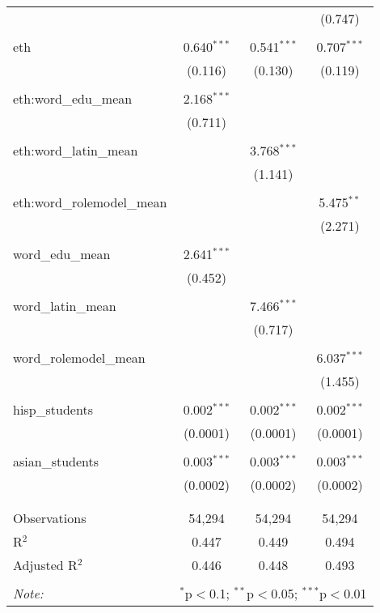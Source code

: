 \begin{table}[!htbp]
\begin{tabular}{@{\extracolsep{-2pt}}lccc}
  &  &  & (0.747) \\ 
  & & & \\ 
 eth & 0.640$^{***}$ & 0.541$^{***}$ & 0.707$^{***}$ \\ 
  & (0.116) & (0.130) & (0.119) \\ 
  & & & \\ 
 eth:word\_edu\_mean & 2.168$^{***}$ &  &  \\ 
  & (0.711) &  &  \\ 
  & & & \\ 
 eth:word\_latin\_mean &  & 3.768$^{***}$ &  \\ 
  &  & (1.141) &  \\ 
  & & & \\ 
 eth:word\_rolemodel\_mean &  &  & 5.475$^{**}$ \\ 
  &  &  & (2.271) \\ 
  & & & \\ 
 word\_edu\_mean & 2.641$^{***}$ &  &  \\ 
  & (0.452) &  &  \\ 
  & & & \\ 
 word\_latin\_mean &  & 7.466$^{***}$ &  \\ 
  &  & (0.717) &  \\ 
  & & & \\ 
 word\_rolemodel\_mean &  &  & 6.037$^{***}$ \\ 
  &  &  & (1.455) \\ 
  & & & \\ 
 hisp\_students & 0.002$^{***}$ & 0.002$^{***}$ & 0.002$^{***}$ \\ 
  & (0.0001) & (0.0001) & (0.0001) \\ 
  & & & \\ 
 asian\_students & 0.003$^{***}$ & 0.003$^{***}$ & 0.003$^{***}$ \\ 
  & (0.0002) & (0.0002) & (0.0002) \\ 
  & & & \\ 
\hline \\[-1.8ex] 
Observations & 54,294 & 54,294 & 54,294 \\ 
R$^{2}$ & 0.447 & 0.449 & 0.494 \\ 
Adjusted R$^{2}$ & 0.446 & 0.448 & 0.493 \\ 
\hline 
\hline \\[-1.8ex] 
\textit{Note:}  & \multicolumn{3}{r}{$^{*}$p$<$0.1; $^{**}$p$<$0.05; $^{***}$p$<$0.01} \\ 
\end{tabular} 
\end{table} 
